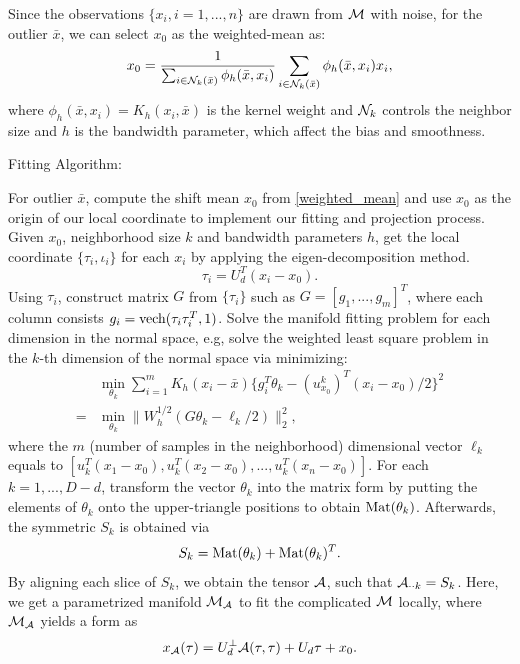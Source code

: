 \documentclass{article}
\theoremstyle{remark}
\begin{document}
Since the observations $\{x_i, i=1,...,n\}$ are drawn from $\cal M$ with noise, for the outlier $\bar{x}$, we can select $x_0$ as the weighted-mean as:
\begin{equation}\label{weighted_mean}
x_0 =\frac{1}{\sum_{i\in {\cal N}_k(\bar{x}) } \phi_h(\bar{x},x_i)} \sum_{i\in {\cal N}_k (\bar{x})} \phi_h(\bar{x},x_i)x_i,
\end{equation}
where $\phi_h(\bar{x},x_i) = K_h(x_i, \bar{x})$ is the kernel weight and ${\cal N}_k$ controls the neighbor size and $h$ is the bandwidth parameter, which affect the bias and smoothness.
\begin{algorithm}[H]
\caption{Fitting Algorithm:}
\label{alg:Fitting}
\begin{algorithmic}
\STATE [1.] For outlier $\bar{x}$, compute the shift mean $x_0$ from \eqref{weighted_mean} and use $x_0$ as the origin of our local coordinate to implement our fitting and projection process.
\STATE [2.] Given $x_0$, neighborhood size $k$ and bandwidth parameters $h$, get the local coordinate $\{\tau_i, \iota_i\}$ for each $x_i$ by applying the eigen-decomposition method.
\[
{\tau}_i = U_d^T(x_i-x_0).%
\]
Using $\tau_i$, construct matrix $G$ from $\{\tau_i\}$ such as $G = [g_1,...,g_m]^T$, where each column consists $g_i = {\rm vech}(\tau_i\tau_i^T, 1)$.%
\STATE [3.] Solve the manifold fitting problem for each dimension in the normal space, e.g, solve the weighted least square problem in the $k$-th dimension of the normal space via minimizing:
\[
\begin{aligned}
  &\min_{\theta_k} \sum_{i=1}^m K_h(x_i-\bar{x})\{ g_i^T \theta_k  -  {(u^k_{x_0})}^T (x_i -x_0)/2\}^2\\
= &\min_{\theta_k}\|W_h^{1/2}(G \theta_k-\ell_k/2) \|_2^2,
\end{aligned}
\]
where the $m$ (number of samples in the neighborhood) dimensional vector $\ell_k$ equals to $[u_k^T(x_1-x_0), u_k^T(x_2-x_0),...,u_k^T(x_n-x_0)]$.
\STATE [4.] For each $k=1,...,D-d$, transform the vector $\theta_k$ into the matrix form by putting the elements of $\theta_k$ onto the upper-triangle positions to obtain ${\rm Mat}(\theta_k)$.  Afterwards, the symmetric $S_k$ is obtained via%
\[
S_k = {\rm Mat}(\theta_k) + {\rm Mat}(\theta_k) ^T.
\]
By aligning each slice of $S_k$, we obtain the tensor $\cal A$, such that ${\cal A}_{\cdot \cdot k}=S_k$.
Here, we get a parametrized manifold ${\cal M_A}$ to fit the complicated $\cal M$ locally, where ${\cal M_A}$ yields a form as
\[
x_{\cal A}(\tau) = U_{d}^{\perp} {\cal A} (\tau, \tau) + U_d \tau +x_0.
\]
\end{algorithmic}
\end{algorithm}
\end{document}
